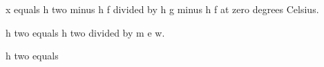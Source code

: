 x equals h two minus h f divided by h g minus h f at zero degrees Celsius.  

h two equals h two divided by m e w.  

h two equals